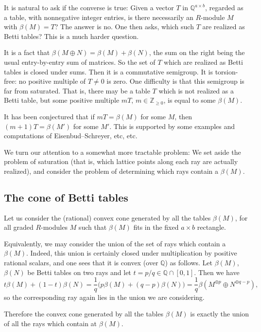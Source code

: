 \documentclass[12pt]{amsart}
\theoremstyle{plain}
\theoremstyle{definition}
\theoremstyle{remark}
\newcommand{\ZZ}{\mathbb{Z}}
\newcommand{\Q}{\mathbb{Q}}
\begin{document}
It is natural to ask if the converse is true: Given a vector $T$ in $\Q^{a \times b}$, regarded as a table,
with nonnegative integer entries, is there necessarily an $R$-module $M$ with $\beta(M) = T$?
The answer is no.
One then asks, which such $T$ are realized as Betti tables?
This is a much harder question.

It is a fact that $\beta(M \oplus N) = \beta(M) + \beta(N)$, the sum on the right being the usual
entry-by-entry sum of matrices.
So the set of $T$ which are realized as Betti tables is closed under sums.
Then it is a commutative semigroup.
It is torsion-free: no positive multiple of $T \neq 0$ is zero.
One difficulty is that this semigroup is far from saturated.
That is, there may be a table $T$ which is not realized as a Betti table, but some positive multiple
$mT$, $m \in \ZZ_{\geq 0}$, is equal to some $\beta(M)$.

It has been conjectured that if $mT = \beta(M)$ for some $M$, then $(m+1)T = \beta(M')$ for some $M'$.
This is supported by some examples and computations of Eisenbud--Schreyer, etc, etc.

We turn our attention to a somewhat more tractable problem: We set aside the problem
of saturation (that is, which lattice points along each ray are actually realized),
and consider the problem of determining which rays contain a $\beta(M)$.

\subsection{The cone of Betti tables}
Let us consider the (rational) convex cone generated by all the tables $\beta(M)$,
for all graded $R$-modules $M$ such that $\beta(M)$ fits in the fixed $a \times b$ rectangle.

Equivalently, we may consider the union of the set of rays which contain a $\beta(M)$.
Indeed, this union is certainly closed under multiplication by positive rational scalars,
and one sees that it is convex (over $\Q$) as follows.
Let $\beta(M)$, $\beta(N)$ be Betti tables on two rays
and let $t = p/q \in \Q \cap [0,1]$.
Then we have
\[
  t \beta(M) + (1-t) \beta(N) = \frac{1}{q} \Big( p \beta(M) + (q-p) \beta(N) \Big) = \frac{1}{q} \beta(M^{\oplus p} \oplus N^{\oplus q-p}) ,
\]
so the corresponding ray again lies in the union we are considering.

Therefore the convex cone generated by all the tables $\beta(M)$ is exactly the union
of all the rays which contain at $\beta(M)$.
\end{document}

